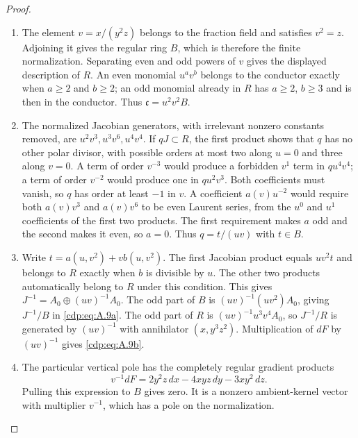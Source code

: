 \begin{proof}

\begin{enumerate}[label={$\langle1\rangle$\arabic*.},leftmargin=*]
\item The element $v=x/(y^2z)$ belongs to the fraction field and satisfies $v^2=z$. Adjoining it gives the regular ring $B$, which is therefore the finite normalization. Separating even and odd powers of $v$ gives the displayed description of $R$. An even monomial $u^av^b$ belongs to the conductor exactly when $a\ge2$ and $b\ge2$; an odd monomial already in $R$ has $a\ge2$, $b\ge3$ and is then in the conductor. Thus $\mathfrak c=u^2v^2B$.

\item The normalized Jacobian generators, with irrelevant nonzero constants removed, are $u^2v^3,u^3v^6,u^4v^4$. If $qJ\subset R$, the first product shows that $q$ has no other polar divisor, with possible orders at most two along $u=0$ and three along $v=0$. A term of order $v^{-3}$ would produce a forbidden $v^1$ term in $qu^4v^4$; a term of order $v^{-2}$ would produce one in $qu^2v^3$. Both coefficients must vanish, so $q$ has order at least $-1$ in $v$. A coefficient $a(v)u^{-2}$ would require both $a(v)v^3$ and $a(v)v^6$ to be even Laurent series, from the $u^0$ and $u^1$ coefficients of the first two products. The first requirement makes $a$ odd and the second makes it even, so $a=0$. Thus $q=t/(uv)$ with $t\in B$.

\item Write $t=a(u,v^2)+v b(u,v^2)$. The first Jacobian product equals $uv^2t$ and belongs to $R$ exactly when $b$ is divisible by $u$. The other two products automatically belong to $R$ under this condition. This gives $J^{-1}=A_0\oplus(uv)^{-1}A_0$. The odd part of $B$ is $(uv)^{-1}(uv^2)A_0$, giving $J^{-1}/B$ in \eqref{cdp:eq:A.9a}. The odd part of $R$ is $(uv)^{-1}u^3v^4A_0$, so $J^{-1}/R$ is generated by $(uv)^{-1}$ with annihilator $(x,y^3z^2)$. Multiplication of $dF$ by $(uv)^{-1}$ gives \eqref{cdp:eq:A.9b}.

\item The particular vertical pole has the completely regular gradient products
\[
 v^{-1}dF=2y^2z\,dx-4xyz\,dy-3xy^2\,dz.
\]
Pulling this expression to $B$ gives zero. It is a nonzero ambient-kernel vector with multiplier $v^{-1}$, which has a pole on the normalization.  

\end{enumerate}
\end{proof}